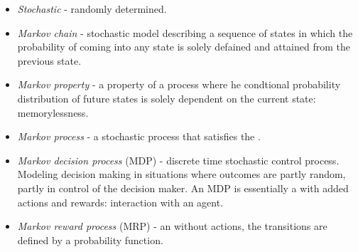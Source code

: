 
\begin{itemize}
    \item \emph{Stochastic}\label{def:stochastic} - randomly determined.
    \item \emph{Markov chain}\label{def:markov_chain} - stochastic model describing a sequence of
    states in which the probability of coming into any state is solely defained and
    attained from the previous state.
    \item \emph{Markov property}\label{def:markov_property} -
    a property of a process where he condtional probability distribution of
    future states is solely dependent on the current state: memorylessness.
    \item \emph{Markov process}\label{def:markov_process} -
    a stochastic process that satisfies the .
    \item \emph{Markov decision process}\label{def:mdp} (MDP) -
    discrete time stochastic control process.
    Modeling decision making in situations where outcomes are partly random,
    partly in control of the decision maker.
    An MDP is essentially a  with added actions
    and rewards: interaction with an agent.
    \item \emph{Markov reward process}\label{def:mrp} (MRP) -
    an  without actions, the transitions are defined by a
    probability function.
\end{itemize}
